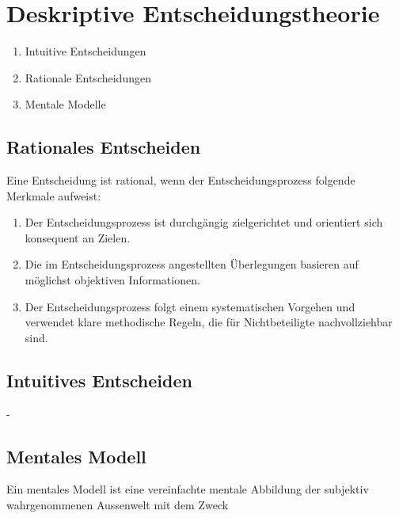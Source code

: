 \documentclass[
	final,
	a4paper,
	oneside,
	parskip=full,
	headings=standardclasses,
	headings=big,
	pointednumbers
]{scrartcl}
\newcommand{\txb}[1]{{\color{blue}#1}}
\newcommand{\txr}[1]{{\color{red}#1}}
\newcommand{\txgr}[1]{{\color{grey}#1}}
\begin{document}
	
    \section*{Deskriptive Entscheidungstheorie}


    \begin{enumerate}[label=$\bullet$]
        \setlength{\parskip}{1mm}
        \item Intuitive Entscheidungen
        \item Rationale Entscheidungen
        \item Mentale Modelle
    \end{enumerate}

	\subsection*{Rationales Entscheiden}
        Eine Entscheidung ist rational, wenn der Entscheidungsprozess folgende
        Merkmale aufweist:

        \begin{enumerate}[label=$\bullet$]
            \setlength{\parskip}{1mm}
            \item Der \txgr{Entscheidungsprozess} ist durchgängig \txb{zielgerichtet} und
                  orientiert sich konsequent an \txr{Zielen}.
            \item Die im \txgr{Entscheidungsprozess} angestellten Überlegungen basieren
                  auf möglichst \txb{objektiven} Informationen.
            \item Der \txgr{Entscheidungsprozess} folgt einem systematischen Vorgehen
                  und verwendet \txb{klare methodische} Regeln, die für Nichtbeteiligte
                  \txb{nachvollziehbar} sind.
        \end{enumerate}
	
	\subsection*{Intuitives Entscheiden}
    
        -

	\subsection*{Mentales Modell}

        Ein mentales Modell ist eine vereinfachte mentale Abbildung
        der subjektiv wahrgenommenen Aussenwelt mit dem Zweck
\end{document}
